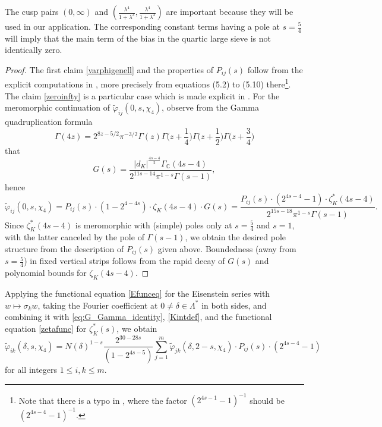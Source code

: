 \documentclass[12pt,reqno]{amsart}
\numberwithin{equation}{section}
\newcommand{\C}{\mathbb{C}}
\begin{document}
\begin{remark}
    The cusp pairs $(0, \infty)$ and $(\frac{\lambda^4}{1+\lambda^3}, \frac{\lambda^4}{1+\lambda^3})$ are important because they will be used in our application. The corresponding constant terms having a pole at $s = \frac{5}{4}$ will imply that the main term of the bias in the quartic large sieve is not identically zero.
\end{remark}

\begin{proof}
    The first claim \eqref{varphigenell} and the properties of $P_{ij}(s)$ follow from the explicit computations in \cite[Section 5]{Suz1}, more precisely from equations (5.2) to (5.10) there\footnote{Note that there is a typo in \cite[(5.10)]{Suz1}, where the factor $(2^{4s-1}-1)^{-1}$ should be $(2^{4s-4}-1)^{-1}$.}. The claim \eqref{zeroinfty} is a particular case which is made explicit in \cite[Proposition 4 and (5.1)]{Suz1}. For the meromorphic continuation of $\widetilde{\varphi}_{ij}(0, s, \chi_4)$, observe from the Gamma quadruplication formula
    \begin{equation*}
        \Gamma(4z) = 2^{8z-5/2} \pi^{-3/2} \Gamma(z)\Gamma\Big(z+\frac{1}{4}\Big) \Gamma\Big(z+\frac{1}{2}\Big)\Gamma\Big(z+\frac{3}{4}\Big)
    \end{equation*}
    that
    \begin{equation}\label{eq:G_Gamma_identity}
        G(s) = \frac{|d_K|^{\frac{4s-4}{2}} \Gamma_\C(4s-4)}{2^{11s-14} \pi^{1-s} \Gamma(s-1)},
    \end{equation}
    hence
    \begin{equation*}
        \widetilde{\varphi}_{ij}(0, s, \chi_4) = P_{ij}(s) \cdot (1-2^{4-4s}) \cdot \zeta_K(4s-4) \cdot G(s) = \frac{P_{ij}(s) \cdot (2^{4s-4}-1) \cdot \zeta^*_K(4s-4)}{2^{15s-18} \pi^{1-s} \Gamma(s-1)}.
    \end{equation*}
    Since $\zeta_K^*(4s-4)$ is meromorphic with (simple) poles only at $s=\frac{5}{4}$ and $s=1$, with the latter canceled by the pole of $\Gamma(s-1)$, we obtain the desired pole structure from the description of $P_{ij}(s)$ given above. Boundedness (away from $s=\frac{5}{4}$) in fixed vertical strips follows from the rapid decay of $G(s)$ and polynomial bounds for $\zeta_K(4s-4)$.
\end{proof}

Applying the functional equation \eqref{Efunceq} for the Eisenstein series with $w \mapsto \sigma_k w$, taking the Fourier coefficient at $0 \neq \delta \in \Lambda^*$ in both sides, and combining it with \eqref{eq:G_Gamma_identity}, \eqref{Kintdef}, and the functional equation \eqref{zetafunc} for $\zeta_K^*(s)$, we obtain
\begin{equation}\label{eq:Eisenstein_functional_equation}
    \widetilde{\varphi}_{ik}(\delta, s, \chi_4) = N(\delta)^{1-s} \frac{2^{30 - 28s}}{(1 - 2^{4s-5})} \sum_{j=1}^m \widetilde{\varphi}_{jk}(\delta, 2-s, \chi_4) \cdot P_{ij}(s) \cdot (2^{4s-4}-1)
\end{equation}
for all integers $1\leq i, k \leq m$.
\end{document}
